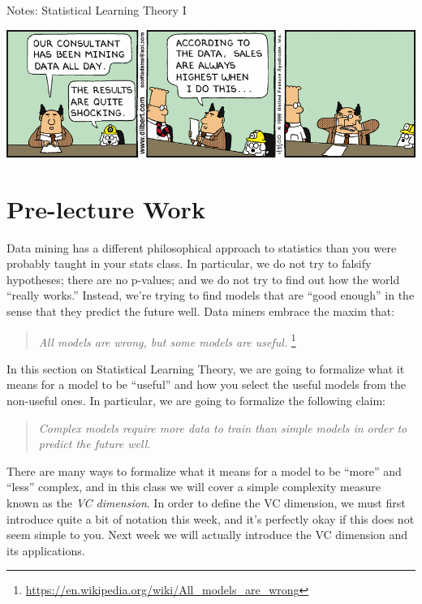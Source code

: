 \documentclass[10pt]{article}
\theoremstyle{definition}
\begin{document}
\begin{center}
\Huge
Notes: Statistical Learning Theory I
\end{center}

\begin{center}
%
\includegraphics[width=\textwidth]{dt000105}

\end{center}

\section{Pre-lecture Work}

Data mining has a different philosophical approach to statistics than you were probably taught in your stats class.
In particular, we do not try to falsify hypotheses;
there are no p-values;
and we do not try to find out how the world ``really works.''
Instead, we're trying to find models that are ``good enough'' in the sense that they predict the future well.
Data miners embrace the maxim that:
\begin{quote}
    \emph{All models are wrong, but some models are useful.}%
    \footnote{\url{https://en.wikipedia.org/wiki/All_models_are_wrong}}
\end{quote}
In this section on Statistical Learning Theory,
we are going to formalize what it means for a model to be ``useful'' and how you select the useful models from the non-useful ones.
In particular, we are going to formalize the following claim:
\begin{quote}
    \emph{Complex models require more data to train than simple models in order to predict the future well.}
\end{quote}
There are many ways to formalize what it means for a model to be ``more'' and ``less'' complex,
and in this class we will cover a simple complexity measure known as the \emph{VC dimension}.
In order to define the VC dimension, we must first introduce quite a bit of notation this week,
and it's perfectly okay if this does not seem simple to you.
Next week we will actually introduce the VC dimension and its applications.
\end{document}
